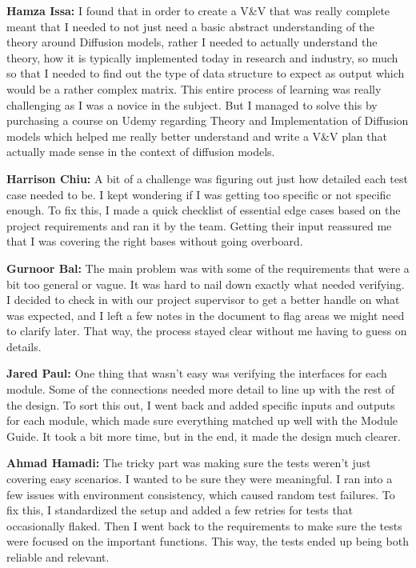 \documentclass[12pt, titlepage]{article}
\begin{document}
\textbf{Hamza Issa:} I found that in order to create a V\&V that was really complete meant that I needed to not just need a basic abstract understanding of the theory around Diffusion models, rather I needed to actually understand the theory, how it is typically implemented today in research and industry, so much so that I needed to find out the type of data structure to expect as output which would be a rather complex matrix. This entire process of learning was really challenging as I was a novice in the subject. But I managed to solve this by purchasing a course on Udemy regarding Theory and Implementation of Diffusion models which helped me really better understand and write a V\&V plan that actually made sense in the context of diffusion models.

\textbf{Harrison Chiu:} A bit of a challenge was figuring out just how detailed each test case needed to be. I kept wondering if I was getting too specific or not specific enough. To fix this, I made a quick checklist of essential edge cases based on the project requirements and ran it by the team. Getting their input reassured me that I was covering the right bases without going overboard.

\textbf{Gurnoor Bal:} The main problem was with some of the requirements that were a bit too general or vague. It was hard to nail down exactly what needed verifying. I decided to check in with our project supervisor to get a better handle on what was expected, and I left a few notes in the document to flag areas we might need to clarify later. That way, the process stayed clear without me having to guess on details.

\textbf{Jared Paul:} One thing that wasn’t easy was verifying the interfaces for each module. Some of the connections needed more detail to line up with the rest of the design. To sort this out, I went back and added specific inputs and outputs for each module, which made sure everything matched up well with the Module Guide. It took a bit more time, but in the end, it made the design much clearer.

\textbf{Ahmad Hamadi:} The tricky part was making sure the tests weren’t just covering easy scenarios. I wanted to be sure they were meaningful. I ran into a few issues with environment consistency, which caused random test failures. To fix this, I standardized the setup and added a few retries for tests that occasionally flaked. Then I went back to the requirements to make sure the tests were focused on the important functions. This way, the tests ended up being both reliable and relevant.
\end{document}
